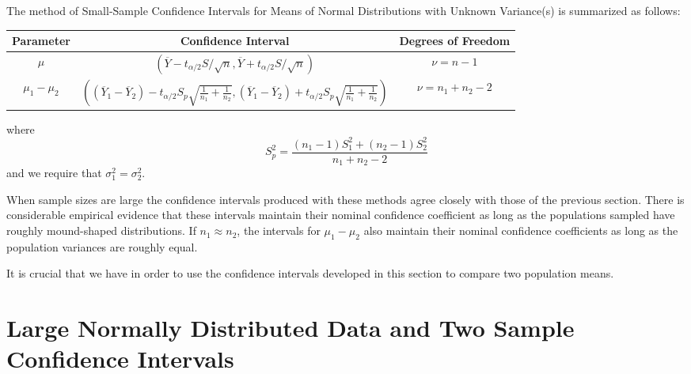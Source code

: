 \documentclass[12pt, a4paper, twoside, openright, titlepage]{book}
\begin{document}
\begin{defn}{}{}
    The method of Small-Sample Confidence Intervals for Means of Normal Distributions with Unknown Variance(s) is summarized as follows: 
    \begin{table}[H]
        \centering
        \begin{tabular}{ccc}
            \hline
            Parameter & Confidence Interval & Degrees of Freedom \\ \hline
            $\mu$ & $\left(\overline{Y} - t_{\alpha/2}S/\sqrt{n}, \overline{Y} + t_{\alpha/2}S/\sqrt{n}\right)$ & $\nu = n-1$ \\
            $\mu_1 - \mu_2$ & $\left((\overline{Y}_1 - \overline{Y}_2) - t_{\alpha/2}S_p\sqrt{\frac{1}{n_1} + \frac{1}{n_2}}, (\overline{Y}_1 - \overline{Y}_2) + t_{\alpha/2}S_p\sqrt{\frac{1}{n_1} + \frac{1}{n_2}}\right)$ & $\nu = n_1 + n_2 - 2$
        \end{tabular}
    \end{table}
    where \begin{equation*}
        S_p^2 = \frac{(n_1 - 1)S_1^2 + (n_2 - 1)S_2^2}{n_1 + n_2 -2} 
    \end{equation*}
    and we require that $\sigma_1^2 = \sigma_2^2$.
\end{defn}

When sample sizes are large the confidence intervals produced with these methods agree closely with those of the previous section. There is considerable empirical evidence that these intervals maintain their nominal confidence coefficient as long as the populations sampled have roughly mound-shaped distributions. If $n_1 \approx n_2$, the intervals for $\mu_1 - \mu_2$ also maintain their nominal confidence coefficients as long as the population variances are roughly equal.

It is crucial that we have  in order to use the confidence intervals developed in this section to compare two population means.


\section{\textsection Large Normally Distributed Data and Two Sample Confidence Intervals}
\end{document}
